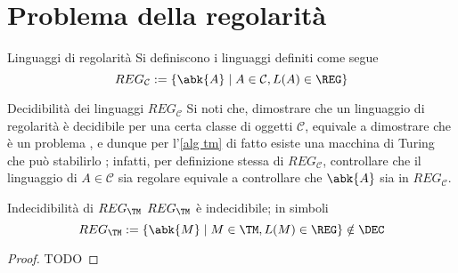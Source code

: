 \documentclass[a4paper, 12pt]{report}
\begin{document}
    \section{Problema della regolarità}

    \begin{frameddefn}{Linguaggi di regolarità}
        Si definiscono  i linguaggi definiti come segue $$REG_\mathcal{C} := \{\abk{A} \mid A \in \mathcal{C} , L(A) \in \REG\}$$
    \end{frameddefn}

    \begin{framedobs}{Decidibilità dei linguaggi $REG_\mathcal C$}
        Si noti che, dimostrare che un linguaggio di regolarità è decidibile per una certa classe di oggetti $\mathcal{C}$, equivale a dimostrare che  è un problema , e dunque per l'\cref{alg tm} di fatto esiste una macchina di Turing che può stabilirlo ; infatti, per definizione stessa di $REG_\mathcal C$, controllare che il linguaggio di $A \in \mathcal{C}$ sia regolare equivale a controllare che $\abk{A}$ sia in $REG_\mathcal{C}$.
    \end{framedobs}

    \begin{framedthm}{Indecidibilità di $REG_\TM$}
        $REG_\TM$ è indecidibile; in simboli $$REG_\TM := \{\abk{M} \mid M \in \TM , L(M) \in \REG\} \notin \DEC$$
    \end{framedthm}

    \begin{proof}
        TODO
    \end{proof}
\end{document}
